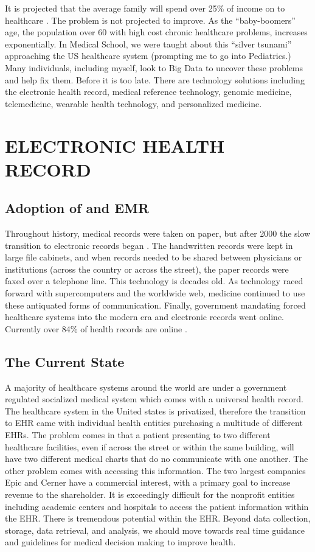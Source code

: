 \documentclass[sigconf]{acmart}
\begin{document}
It is projected that the average family will spend over 25\% of income
on to healthcare \cite{fox6}.  The problem is not projected to improve.  As
the “baby-boomers” age, the population over 60 with high cost chronic
healthcare problems, increases exponentially.  In Medical School, we
were taught about this “silver tsunami” approaching the US healthcare
system (prompting me to go into Pediatrics.)  Many individuals,
including myself, look to Big Data to uncover these problems and help
fix them. Before it is too late.  There are technology solutions
including the electronic health record, medical reference technology,
genomic medicine, telemedicine, wearable health technology, and
personalized medicine.

\section{ELECTRONIC HEALTH RECORD}

\subsection{Adoption of and EMR}

Throughout history, medical records were taken on paper, but after 2000 the slow transition to electronic records began \cite{kokkonen2013use}. The handwritten records were kept in large file cabinets, and when records needed to be shared between physicians or institutions (across the country or across the street), the paper records were faxed over a telephone line.  This technology is decades old.  As technology raced forward with supercomputers and the worldwide web, medicine continued to use these antiquated forms of communication.  Finally, government mandating forced healthcare systems into the modern era and electronic records went online.  Currently over 84\% of health records are online \cite{fox6}.  

\subsection{	The Current State}

A majority of healthcare systems around the world are under a government regulated socialized medical system which comes with a universal health record. The healthcare system in the United states is privatized, therefore the transition to EHR came with individual health entities purchasing a multitude of different EHRs.  The problem comes in that a patient presenting to two different healthcare facilities, even if across the street or within the same building, will have two different medical charts that do no communicate with one another.  
The other problem comes with accessing this information.  The two largest companies Epic and Cerner have a commercial interest, with a primary goal to increase revenue to the shareholder.  It is exceedingly difficult for the nonprofit entities including academic centers and hospitals to access the patient information within the EHR. There is tremendous potential within the EHR.  Beyond data collection, storage, data retrieval, and analysis, we should move towards real time guidance and guidelines for medical decision making to improve health.   
 
\end{document}
